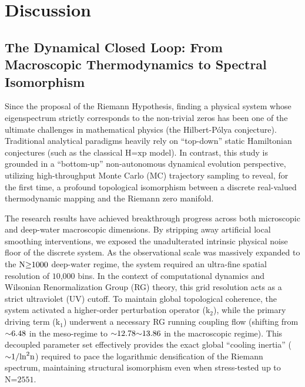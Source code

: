 \documentclass[fleqn,10pt]{wlscirep}
\begin{document}
\section*{Discussion}

\subsection*{The Dynamical Closed Loop: From Macroscopic Thermodynamics to Spectral Isomorphism}

Since the proposal of the Riemann Hypothesis, finding a physical system
whose eigenspectrum strictly corresponds to the non-trivial zeros has
been one of the ultimate challenges in mathematical physics (the
Hilbert-P\'olya conjecture). Traditional analytical paradigms heavily rely
on ``top-down'' static Hamiltonian conjectures (such as the classical
\(\text{H}\text{=}\text{xp}\) model). In contrast, this study is
grounded in a ``bottom-up'' non-autonomous dynamical evolution
perspective, utilizing high-throughput Monte Carlo (MC) trajectory
sampling to reveal, for the first time, a profound topological
isomorphism between a discrete real-valued thermodynamic mapping and the
Riemann zero manifold.

The research results have achieved breakthrough progress across both
microscopic and deep-water macroscopic dimensions. By stripping away
artificial local smoothing interventions, we exposed the unadulterated
intrinsic physical noise floor of the discrete system. As the
observational scale was massively expanded to the
\(\text{N}\text{\ensuremath{\ge}1000}\) deep-water regime, the system required an
ultra-fine spatial resolution of \(\text{10,000}\) bins. In the context
of computational dynamics and Wilsonian Renormalization Group (RG)
theory, this grid resolution acts as a strict ultraviolet (UV) cutoff.
To maintain global topological coherence, the system activated a
higher-order perturbation operator (\(\text{k}_{\text{2}}\)), while the
primary driving term (\(\text{k}_{\text{1}}\)) underwent a necessary RG
running coupling flow (shifting from \(\text{\ensuremath{\sim}6.48}\) in the meso-regime
to \(\text{\ensuremath{\sim}12.78\ensuremath{\sim}13.86}\) in the macroscopic regime). This decoupled
parameter set effectively provides the exact global ``cooling inertia''
(\(\text{\ensuremath{\sim}1/}\text{ln}^{\text{2}}\text{n}\)) required to pace the
logarithmic densification of the Riemann spectrum, maintaining
structural isomorphism even when stress-tested up to
\(\text{N}\text{=2551}\).
\end{document}
